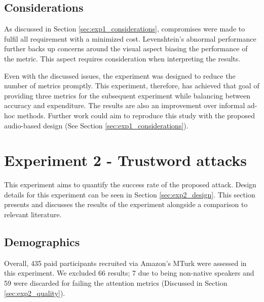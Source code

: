 \subsection*{Considerations}
As discussed in Section \ref{sec:exp1_considerations}, compromises were made to fulfil all requirement with a minimized cost. Levenshtein's abnormal performance further backs up concerns around the visual aspect biasing the performance of the metric. This aspect requires consideration when interpreting the results. 

Even with the discussed issues, the experiment was designed to reduce the number of metrics promptly. This experiment, therefore, has achieved that goal of providing three metrics for the subsequent experiment while balancing between accuracy and expenditure. The results are also an improvement over informal ad-hoc methods. Further work could aim to reproduce this study with the proposed audio-based design (See Section \ref{sec:exp1_considerations}).



\newpage

\section{Experiment 2 - Trustword attacks}
\label{sec:exp2}
This experiment aims to quantify the success rate of the proposed attack. Design details for this experiment can be seen in Section \ref{sec:exp2_design}. This section presents and discusses the results of the experiment alongside a comparison to relevant literature.

\subsection*{Demographics}
Overall, 435 paid participants recruited via Amazon's MTurk were assessed in this experiment. We excluded 66 results; 7 due to being non-native speakers and 59 were discarded for failing the attention metrics (Discussed in Section \ref{sec:exp2_quality}).

